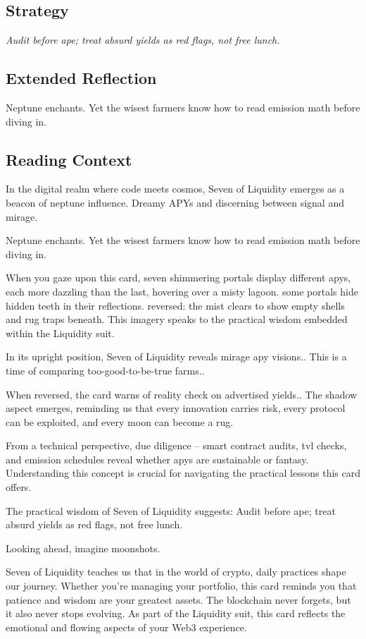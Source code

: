 \documentclass[11pt,oneside]{book}
\begin{document}
\begin{minipage}[t]{0.55\textwidth}
  \subsection*{Strategy}
  \textit{Audit before ape; treat absurd yields as red flags, not free lunch.}

  \subsection*{Extended Reflection}
  Neptune enchants. Yet the wisest farmers know how to read emission math before diving in.

  \subsection*{Reading Context}
  In the digital realm where code meets cosmos, Seven of Liquidity emerges as a beacon of neptune influence. Dreamy APYs and discerning between signal and mirage.

  Neptune enchants. Yet the wisest farmers know how to read emission math before diving in.

  When you gaze upon this card, seven shimmering portals display different apys, each more dazzling than the last, hovering over a misty lagoon. some portals hide hidden teeth in their reflections. reversed: the mist clears to show empty shells and rug traps beneath. This imagery speaks to the practical wisdom embedded within the Liquidity suit.

  In its upright position, Seven of Liquidity reveals mirage apy visions.. This is a time of comparing too-good-to-be-true farms..

  When reversed, the card warns of reality check on advertised yields.. The shadow aspect emerges, reminding us that every innovation carries risk, every protocol can be exploited, and every moon can become a rug.

  From a technical perspective, due diligence – smart contract audits, tvl checks, and emission schedules reveal whether apys are sustainable or fantasy. Understanding this concept is crucial for navigating the practical lessons this card offers.

  The practical wisdom of Seven of Liquidity suggests: Audit before ape; treat absurd yields as red flags, not free lunch.

  Looking ahead, imagine moonshots.

  Seven of Liquidity teaches us that in the world of crypto, daily practices shape our journey. Whether you're managing your portfolio, this card reminds you that patience and wisdom are your greatest assets. The blockchain never forgets, but it also never stops evolving. As part of the Liquidity suit, this card reflects the emotional and flowing aspects of your Web3 experience.

\end{minipage}
\end{document}
